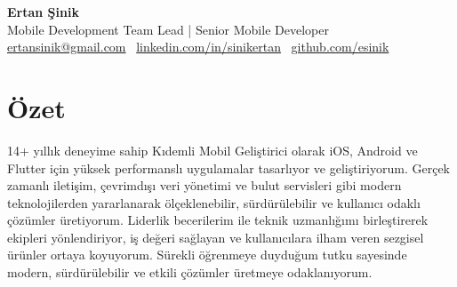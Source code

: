 \documentclass[10pt,a4paper]{extarticle}
\begin{document}
\begin{center}
    \begin{minipage}{\textwidth}
        \centering
        {\LARGE\textbf{Ertan Şinik}}\\[5pt]
		{\normalsize Mobile Development Team Lead | Senior Mobile Developer}\\[5pt]
        \href{mailto:ertansinik@gmail.com}{ertansinik@gmail.com} \textbullet\
        \href{https://linkedin.com/in/sinikertan}{linkedin.com/in/sinikertan} \textbullet\
        \href{https://github.com/esinik}{github.com/esinik}
    \end{minipage}
\end{center}
\section{Özet}
14+ yıllık deneyime sahip Kıdemli Mobil Geliştirici olarak iOS, Android ve Flutter için yüksek performanslı uygulamalar tasarlıyor ve geliştiriyorum. Gerçek zamanlı iletişim, çevrimdışı veri yönetimi ve bulut servisleri gibi modern teknolojilerden yararlanarak ölçeklenebilir, sürdürülebilir ve kullanıcı odaklı çözümler üretiyorum. Liderlik becerilerim ile teknik uzmanlığımı birleştirerek ekipleri yönlendiriyor, iş değeri sağlayan ve kullanıcılara ilham veren sezgisel ürünler ortaya koyuyorum. Sürekli öğrenmeye duyduğum tutku sayesinde modern, sürdürülebilir ve etkili çözümler üretmeye odaklanıyorum.
\end{document}
